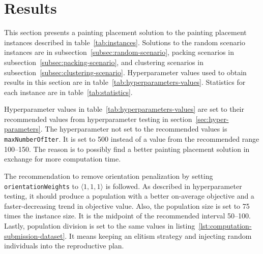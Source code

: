 \clearpage
\newpage


\section{Results}\label{sec:results}
This section presents a painting placement solution to the painting placement instances described in table~\ref{tab:instances}.
Solutions to the random scenario instances are in subsection~\ref{subsec:random-scenario},
packing scenarios in subsection~\ref{subsec:packing-scenario}, and clustering scenarios in subsection~\ref{subsec:clustering-scenario}.
Hyperparameter values used to obtain results in this section are in table~\ref{tab:hyperparameters-values}.
Statistics for each instance are in table~\ref{tab:statistics}.

Hyperparameter values in table~\ref{tab:hyperparameters-values} are set to their recommended values
from hyperparameter testing in section~\ref{sec:hyper-parameters}.
The hyperparameter not set to the recommended values is \verb|maxNumberOfIter|.
It is set to 500 instead of a value from the recommended range \numrange{100}{150}.
The reason is to possibly find a better painting placement solution in exchange for more computation time.

The recommendation to remove orientation penalization by setting \verb|orientationWeights| to $\langle 1,1,1\rangle$ is followed.
As described in hyperparameter testing, it should produce a population with a better on-average objective and a faster-decreasing trend in objective value.
Also, the population size is set to 75 times the instance size.
It is the midpoint of the recommended interval \numrange{50}{100}.
Lastly, population division is set to the same values in listing~\ref{lst:computation-submission-dataset}.
It means keeping an elitism strategy and injecting random individuals into the reproductive plan.

